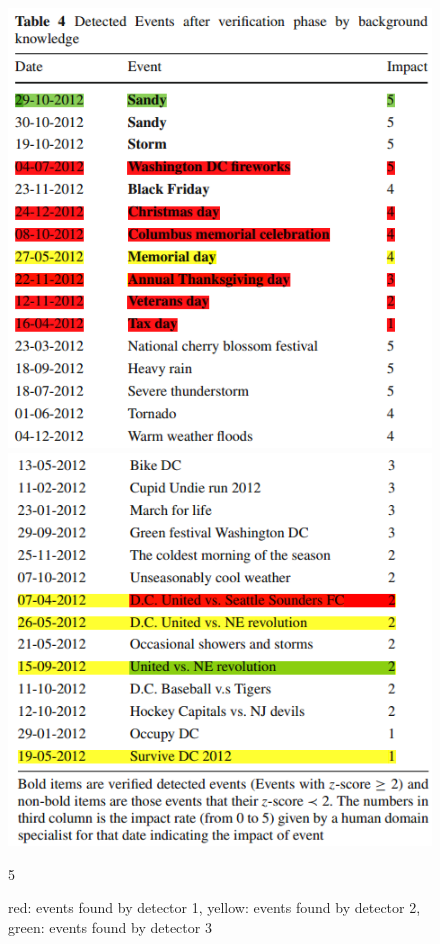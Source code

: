 \documentclass[12pt]{article}
\begin{document}
 	\begin{figure}[H]
 		\centering
 		\begin{minipage}{.48\textwidth}
 			\centering
 			\includegraphics[width=\linewidth]{figures/event_Gama1.png}
 		\end{minipage}%
 		\begin{minipage}{.48\textwidth}
 			\centering
 			\includegraphics[width=\linewidth]{figures/event_Gama2.png}
 		\end{minipage}
 		5\caption{red: events found by detector 1, yellow: events found by detector 2, green: events found by detector 3}
 	\end{figure}
\end{document}
